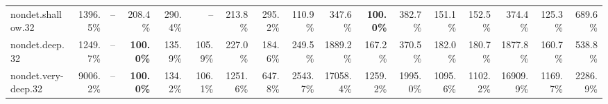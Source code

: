 \documentclass[varwidth,border=2pt]{standalone}
\begin{document}
\begin{center}
{\begin{tabular}{lrrrrrrrrrrrrrrrr}
nondet.shallow.32 & 1396.5\% & -- & 208.4\% & 290.4\% & -- & 213.8\% & 295.2\% & 110.9\% & 347.6\% & \textbf{100.0\%} & 382.7\% & 151.1\% & 152.5\% & 374.4\% & 125.3\% & 689.6\% \\
nondet.deep.32 & 1249.7\% & -- & \textbf{100.0\%} & 135.9\% & 105.9\% & 227.0\% & 184.6\% & 249.5\% & 1889.2\% & 167.2\% & 370.5\% & 182.0\% & 180.7\% & 1877.8\% & 160.7\% & 538.8\% \\
nondet.very-deep.32 & 9006.2\% & -- & \textbf{100.0\%} & 134.2\% & 106.1\% & 1251.6\% & 647.8\% & 2543.7\% & 17058.4\% & 1259.2\% & 1995.0\% & 1095.6\% & 1102.2\% & 16909.9\% & 1169.7\% & 2286.9\% \\
\bottomrule
\end{tabular}
}
\end{center}
\end{document}
